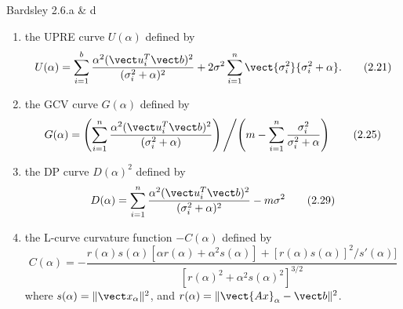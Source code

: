 \documentclass{homework}
\begin{document}
\begin{longproblem}Bardsley 2.6.a \& d

\begin{enumerate}[i]
  \item the UPRE curve $U(\alpha)$ defined by 
  \begin{equation}
  U(\alpha) = \sum_{i=1}^b \frac{\alpha^2 (\vect u_i^T \vect b)^2}{(\sigma_i^2 + \alpha)^2} + 2\sigma^2 \sum_{i=1}^n \vect {\sigma_i^2}{\sigma_i^2 + \alpha}.\tag{2.21}\label{upre}
  \end{equation}
  \item the GCV curve $G(\alpha)$ defined by 
  \begin{equation}
  G(\alpha) = \left(\sum_{i=1}^n \frac{\alpha^2(\vect u_i^T \vect b)^2}{(\sigma_i^2 + \alpha)} \right) \left/ \middle( m - \sum_{i=1}^n\frac{\sigma_i^2}{\sigma_i^2 + \alpha} \right)\tag{2.25}\label{gcv}
  \end{equation}
  \item the DP curve $D(\alpha)^2$ defined by 
  \begin{equation}
  D(\alpha) = \sum_{i=1}^n \frac{\alpha^2 (\vect u_i^T \vect b)^2}{(\sigma_i^2 + \alpha)^2} - m\sigma^2 \tag{2.29}\label{dpcurve}
  \end{equation}
  \item the L-curve curvature function $-C(\alpha)$ defined by 
  \begin{equation}
  C(\alpha) = -\frac{r(\alpha) s(\alpha) [\alpha r(\alpha) + \alpha^2 s(\alpha) ] + [r(\alpha)s(\alpha)]^2/s'(\alpha)]}{[r(\alpha)^2 + \alpha^2 s(\alpha)^2]^{3/2}}\tag{2.37}\label{lcurve}
  \end{equation} 
  where $s(\alpha) = \|\vect x_\alpha\|^2$, and $r(\alpha) = \|\vect{Ax}_\alpha - \vect b\|^2$.
\end{enumerate}

\end{longproblem}
\end{document}
